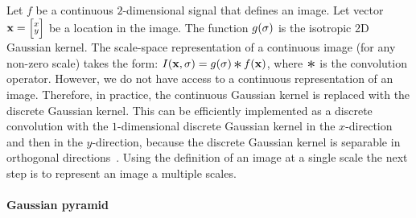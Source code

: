         Let $f$ be a continuous $2$-dimensional signal that defines an
          image.
        Let vector $\mathbf{x}= \Bigl[\negthinspace \begin{smallmatrix}  x\\ y \end{smallmatrix} \negthinspace \Bigr] $ be a location in the image.
        The function $g(\sigma)$
        is the isotropic 2D Gaussian kernel.
        The scale-space representation of a continuous image (for any
          non-zero scale) takes the form:
        $\img(\pt, \scale) = g(\scale) \conv f(\pt)$, where $\conv$ is
          the convolution operator.
        However, we do not have access to a continuous representation
          of an image.
        Therefore, in practice, the continuous Gaussian kernel is
          replaced with the discrete Gaussian kernel.
        This can be efficiently implemented as a discrete convolution
          with the $1$-dimensional discrete Gaussian kernel in the
          $x$-direction and then in the $y$-direction, because the
          discrete Gaussian kernel is separable in orthogonal
          directions~\cite{lindeberg_scalespace_1993}.
        Using the definition of an image at a single scale the next
          step is to represent an image a multiple scales.





       \paragraph{Gaussian pyramid}

           \newcommand{\downsamp}[2]{#1[::\tightpad#2,::\tightpad#2]}

